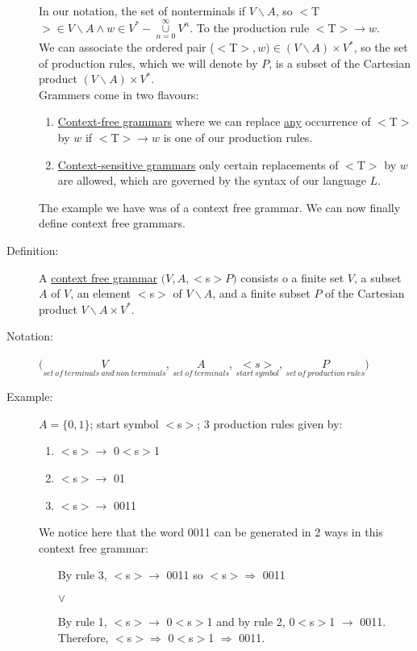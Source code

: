 \documentclass[10pt]{article}
\begin{document}
\begin{description}
		In our notation, the set of nonterminals if $V \backslash A$, so $<$T$>\in V \backslash A \land w \in V^* - \underset{n=0}{\overset{\infty}{\cup}} V^n$. To the production rule $<$T$>\rightarrow w$. \\
		We can associate the ordered pair ($<$T$>, w) \in (V \backslash A) \times V^*$, so the set of production rules, which we will denote by $P$, is a subset of the Cartesian product $(V\backslash A) \times V^*$. \\
		Grammers come in two flavours:
		\begin{enumerate}
			\item \underline{Context-free grammars} where we can replace \underline{any} occurrence of $<$T$>$ by $w$ if $<$T$>\rightarrow w$ is one of our production rules.
			\item \underline{Context-sensitive grammars} only certain replacements of $<$T$>$ by $w$ are allowed, which are governed by the syntax of our language $L$.
		\end{enumerate}
		The example we have was of a context free grammar. We can now finally define context free grammars.
		\item[Definition:] A \underline{context free grammar} $(V, A, <$s$>P)$ consists o a finite set $V$, a subset $A$ of $V$, an element $<$s$>$ of $V \backslash A$, and a finite subset $P$ of the Cartesian product $V\backslash A \times V^*$.
		\item[Notation:] $(\underset{set\:of\:terminals\:and\:non\:terminals}{V}$, $\underset{set\:of\:terminals}{A}$, $\underset{start\:symbol}{{<}s{>}}$, $\underset{set\:of\:production\:rules}{P})$
		\item[Example:] $A = \{0, 1\}$; start symbol $<$s$>$; 3 production rules given by:
		\begin{enumerate}
			\item $<$s$>\rightarrow$ 0$<$s$>$1
			\item $<$s$>\rightarrow$ 01
			\item $<$s$>\rightarrow$ 0011
		\end{enumerate}
		We notice here that the word 0011 can be generated in 2 ways in this context free grammar:
		\begin{enumerate}
			\item[By rule 3,] $<$s$>\rightarrow$ 0011 so $<$s$>\Rightarrow$ 0011
			\item[] $\lor$
			\item[By rule 1,] $<$s$>\rightarrow$ 0$<$s$>$1 and by rule 2, 0$<$s$>$1 $\rightarrow$ 0011. Therefore, $<$s$>\Rightarrow$ 0$<$s$>$1 $\Rightarrow$ 0011.

\end{enumerate}
\end{description}
\end{document}
